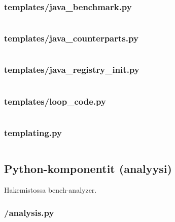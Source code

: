 \documentclass[a4paper,11pt]{article}
\begin{document}
\subsubsection{templates/java\_benchmark.py}
\inputminted[fontsize=\footnotesize, linenos, numbersep=5pt, tabsize=4, frame=topline,framesep=0.8cm]{python}{/home/tituomin/StudioProjects/nativebenchmark/script/templates/java_benchmark.py}
\vspace{1cm}
\subsubsection{templates/java\_counterparts.py}
\inputminted[fontsize=\footnotesize, linenos, numbersep=5pt, tabsize=4, frame=topline,framesep=0.8cm]{python}{/home/tituomin/StudioProjects/nativebenchmark/script/templates/java_counterparts.py}
\vspace{1cm}
\subsubsection{templates/java\_registry\_init.py}
\inputminted[fontsize=\footnotesize, linenos, numbersep=5pt, tabsize=4, frame=topline,framesep=0.8cm]{python}{/home/tituomin/StudioProjects/nativebenchmark/script/templates/java_registry_init.py}
\vspace{1cm}
\subsubsection{templates/loop\_code.py}
\inputminted[fontsize=\footnotesize, linenos, numbersep=5pt, tabsize=4, frame=topline,framesep=0.8cm]{python}{/home/tituomin/StudioProjects/nativebenchmark/script/templates/loop_code.py}
\vspace{1cm}
\subsubsection{templating.py}
\inputminted[fontsize=\footnotesize, linenos, numbersep=5pt, tabsize=4, frame=topline,framesep=0.8cm]{python}{/home/tituomin/StudioProjects/nativebenchmark/script/templating.py}
\newpage
\subsection{Python-komponentit (analyysi)}
Hakemistossa bench-analyzer.
\vspace{1cm}
\subsubsection{/analysis.py}
\inputminted[fontsize=\footnotesize, linenos, numbersep=5pt, tabsize=4, frame=topline,framesep=0.8cm]{python}{/home/tituomin/StudioProjects/bench-analyzer/bench-analyzer/analysis.py}
\vspace{1cm}
\end{document}
